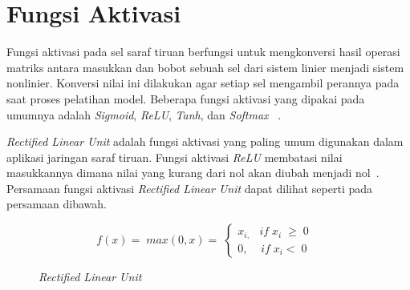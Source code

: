 \section{Fungsi Aktivasi}
\label{sec:2-FungsiAktivasi}

Fungsi aktivasi pada sel saraf tiruan berfungsi untuk mengkonversi hasil operasi matriks antara
masukkan dan bobot sebuah sel dari sistem linier menjadi sistem nonlinier. Konversi nilai ini dilakukan
agar setiap sel mengambil perannya pada saat proses pelatihan model. Beberapa fungsi aktivasi yang
dipakai pada umumnya adalah \textit{Sigmoid}, \textit{ReLU}, \textit{Tanh}, dan \textit{Softmax}
~\cite{2014arXiv1412.6830A}.

\textit{Rectified Linear Unit} adalah fungsi aktivasi yang paling umum digunakan dalam aplikasi
jaringan saraf tiruan. Fungsi aktivasi \textit{ReLU} membatasi nilai masukkannya dimana nilai yang
kurang dari nol akan diubah menjadi nol~\cite{Hinton_rectifiedlinear, 2018arXiv181103378N}.
Persamaan fungsi aktivasi \textit{Rectified Linear Unit} dapat dilihat seperti pada persamaan dibawah.

\begin{equation*}
    \;f(x)=\;max\left(0,x\right)=\;\left\{\begin{array}{l}x_{i,\;}\;\;if\;x_i\;\geq\;0\\0,\;\;\;\;if\;x_i<\;0\;\;\end{array}\right.\;\;
\end{equation*}

\begin{figure}[htbp]
    \begin{center}
    \end{center}
    \vspace{-20pt}
    \captionsetup{labelfont=bf, textfont=bf}
    \caption{\textit{Rectified Linear Unit}}
    \vspace{-10pt}
    \captionsetup{labelfont=md, textfont=md}
    \label{fig:relu}
\end{figure}

